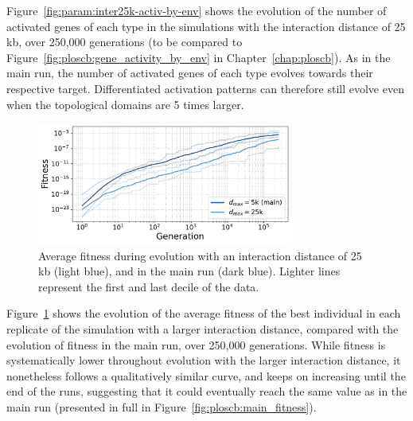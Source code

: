 Figure~\ref{fig:param:inter25k-activ-by-env} shows the evolution of the number of activated genes of each type in the simulations with the interaction distance of 25 kb, over 250,000 generations (to be compared to Figure~\ref{fig:ploscb:gene_activity_by_env} in Chapter~\ref{chap:ploscb}).
As in the main run, the number of activated genes of each type evolves towards their respective target.
Differentiated activation patterns can therefore still evolve even when the topological domains are 5 times larger.

\begin{figure}[H]
\centering
\includegraphics[width=0.75\textwidth]{param/interaction-25k/fitness_all_with_main.pdf}
\caption[Average fitness during evolution, with an interaction distance of 25 kb]{Average fitness during evolution with an interaction distance of 25 kb (light blue), and in the main run (dark blue).
Lighter lines represent the first and last decile of the data.}
\label{fig:param:inter25k-fitness}
\end{figure}

Figure~\ref{fig:param:inter25k-fitness} shows the evolution of the average fitness of the best individual in each replicate of the simulation with a larger interaction distance, compared with the evolution of fitness in the main run, over 250,000 generations.
While fitness is systematically lower throughout evolution with the larger interaction distance, it nonetheless follows a qualitatively similar curve, and keeps on increasing until the end of the runs, suggesting that it could eventually reach the same value as in the main run (presented in full in Figure~\ref{fig:ploscb:main_fitness}).

